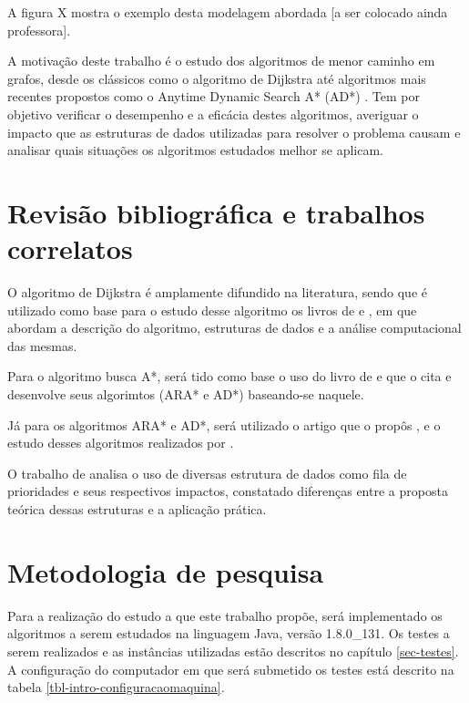 A figura X mostra o exemplo desta modelagem abordada [a ser colocado ainda professora].

A motivação deste trabalho é o estudo dos algoritmos de menor caminho em grafos, desde os clássicos como o algoritmo de Dijkstra \cite{dijkstra1959note} até algoritmos mais recentes propostos como o Anytime Dynamic Search A* (AD*) \cite{likhachev2008anytime}. Tem por  objetivo verificar o desempenho e a eficácia destes algoritmos, averiguar o impacto que as estruturas de dados utilizadas para resolver o problema causam e analisar quais situações os algoritmos estudados melhor se aplicam.

\section{Revisão bibliográfica e trabalhos correlatos}
\label{sec-intro-correlatos}
O algoritmo de Dijkstra é amplamente difundido na literatura, sendo que é utilizado como base para o estudo desse algoritmo os livros de  e , em que abordam a descrição do algoritmo, estruturas de dados e a análise computacional das mesmas.

Para o algoritmo busca A*, será tido como base o uso do livro de  e  que o cita e desenvolve seus algorimtos (ARA* e AD*) baseando-se naquele.

Já para os algoritmos ARA* e AD*, será utilizado o artigo que o propôs \cite{likhachev2008anytime}, e o estudo desses algoritmos realizados por .

O trabalho de  analisa o uso de diversas estrutura de dados como fila de prioridades e seus respectivos impactos, constatado diferenças entre a proposta teórica dessas estruturas e a aplicação prática.
\section{Metodologia de pesquisa}
\label{sec-intro-metodologia}
Para a realização do estudo a que este trabalho propõe, será implementado os algoritmos a serem estudados na linguagem Java, versão 1.8.0\_131. Os testes a serem realizados e as instâncias utilizadas estão descritos no capítulo \ref{sec-testes}. A configuração do computador em que será submetido os testes está descrito na tabela \ref{tbl-intro-configuracaomaquina}.


